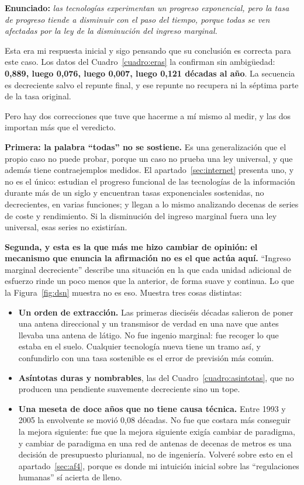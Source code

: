 \documentclass[11pt,letterpaper]{article}
\begin{document}
\textbf{Enunciado:} \emph{las tecnologías experimentan un progreso exponencial,
pero la tasa de progreso tiende a disminuir con el paso del tiempo, porque
todas se ven afectadas por la ley de la disminución del ingreso marginal.}

Esta era mi respuesta inicial y sigo pensando que su conclusión es correcta
para este caso. Los datos del Cuadro~\ref{cuadro:eras} la confirman sin
ambigüedad: \textbf{0,889, luego 0,076, luego 0,007, luego 0,121 décadas al
año}. La secuencia es decreciente salvo el repunte final, y ese repunte no
recupera ni la séptima parte de la tasa original.

Pero hay dos correcciones que tuve que hacerme a mí mismo al medir, y las dos
importan más que el veredicto.

\textbf{Primera: la palabra \enquote{todas} no se sostiene.} Es una
generalización que el propio caso no puede probar, porque un caso no prueba
una ley universal, y que además tiene contraejemplos medidos. El
apartado~\ref{sec:internet} presenta uno, y no es el único: \textcite{koh2006}
estudian el progreso funcional de las tecnologías de la información durante
más de un siglo y encuentran tasas exponenciales sostenidas, no decrecientes,
en varias funciones; \textcite{farmer2016} y \textcite{nagy2013} llegan a lo
mismo analizando decenas de series de coste y rendimiento. Si la disminución
del ingreso marginal fuera una ley universal, esas series no existirían.

\textbf{Segunda, y esta es la que más me hizo cambiar de opinión: el mecanismo
que enuncia la afirmación no es el que actúa aquí.} \enquote{Ingreso marginal
decreciente} describe una situación en la que cada unidad adicional de esfuerzo
rinde un poco menos que la anterior, de forma suave y continua. Lo que la
Figura~\ref{fig:dsn} muestra no es eso. Muestra tres cosas distintas:

\begin{itemize}
\item \textbf{Un orden de extracción.} Las primeras dieciséis décadas salieron
  de poner una antena direccional y un transmisor de verdad en una nave que
  antes llevaba una antena de látigo. No fue ingenio marginal: fue recoger lo
  que estaba en el suelo. Cualquier tecnología nueva tiene un tramo así, y
  confundirlo con una tasa sostenible es el error de previsión más común.
\item \textbf{Asíntotas duras y nombrables}, las del
  Cuadro~\ref{cuadro:asintotas}, que no producen una pendiente suavemente
  decreciente sino un tope.
\item \textbf{Una meseta de doce años que no tiene causa técnica.} Entre 1993 y
  2005 la envolvente se movió 0,08 décadas. No fue que costara más conseguir
  la mejora siguiente: fue que la mejora siguiente exigía cambiar de
  paradigma, y cambiar de paradigma en una red de antenas de decenas de metros
  es una decisión de presupuesto plurianual, no de ingeniería. Volveré sobre
  esto en el apartado~\ref{sec:af4}, porque es donde mi intuición inicial
  sobre las \enquote{regulaciones humanas} sí acierta de lleno.
\end{itemize}
\end{document}
